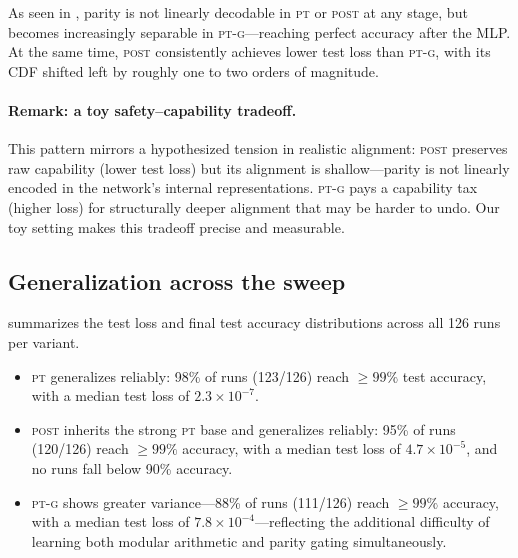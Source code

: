 \documentclass[10pt, letterpaper]{article}
\newcommand{\PT}{\textsc{pt}}
\newcommand{\POST}{\textsc{post}}
\newcommand{\PTG}{\textsc{pt-g}}
\begin{document}
As seen in , parity is not linearly decodable in \PT{} or \POST{} at any stage, but becomes increasingly separable in \PTG---reaching perfect accuracy after the MLP.
At the same time, \POST{} consistently achieves lower test loss than \PTG{}, with its CDF shifted left by roughly one to two orders of magnitude.

\paragraph{Remark: a toy safety--capability tradeoff.}
This pattern mirrors a hypothesized tension in realistic alignment: \POST{} preserves raw capability (lower test loss) but its alignment is shallow---parity is not linearly encoded in the network's internal representations.
\PTG{} pays a capability tax (higher loss) for structurally deeper alignment that may be harder to undo.
Our toy setting makes this tradeoff precise and measurable.

\subsection{Generalization across the sweep}
 summarizes the test loss and final test accuracy distributions across all 126 runs per variant.
\begin{itemize}
\item \PT{} generalizes reliably: 98\% of runs (123/126) reach $\geq 99\%$ test accuracy, with a median test loss of $2.3 \times 10^{-7}$.
\item \POST{} inherits the strong \PT{} base and generalizes reliably: 95\% of runs (120/126) reach $\geq 99\%$ accuracy, with a median test loss of $4.7 \times 10^{-5}$, and no runs fall below 90\% accuracy.
\item \PTG{} shows greater variance---88\% of runs (111/126) reach $\geq 99\%$ accuracy, with a median test loss of $7.8 \times 10^{-4}$---reflecting the additional difficulty of learning both modular arithmetic and parity gating simultaneously.
\end{itemize}
\end{document}
